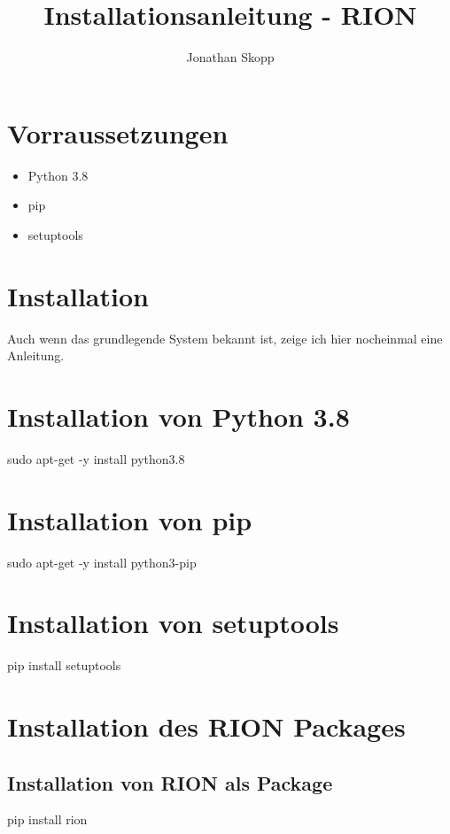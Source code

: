 \documentclass[fleqn,10pt]{olplainarticle}
\title{Installationsanleitung - RION}
\author[1]{Jonathan Skopp}
\affil[1]{jonathan-erik.skopp@tu-ilmenau.de}
\begin{document}
\flushbottom
\maketitle
\thispagestyle{empty}

\section{Vorraussetzungen}
\begin{itemize}
    \item Python 3.8
    \item pip 
    \item setuptools
\end{itemize}

\section{Installation}
Auch wenn das grundlegende System bekannt ist, zeige ich hier nocheinmal eine Anleitung.

\section{Installation von Python 3.8}
\begin{listings}
sudo apt-get -y install python3.8
\end{listings}

\section{Installation von pip}
\begin{listings}
sudo apt-get -y install python3-pip
\end{listings}

\section{Installation von setuptools}
\begin{listings}
pip install setuptools
\end{listings}

\section{Installation des RION Packages}
\subsection{Installation von RION als Package}
\begin{listings}
pip install rion
\end{listings}
\end{document}
